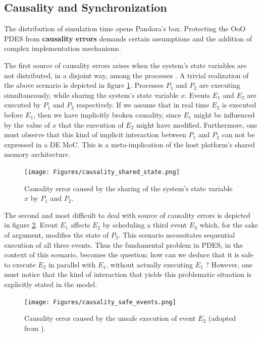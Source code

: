 \documentclass[12pt,twoside]{article}
\begin{document}
\subsection{Causality and Synchronization}
\label{sec-4-5}
The distribution of simulation time opens Pandora's box. 
Protecting the OoO PDES from \textbf{causality errors} demands certain assumptions and the addition of complex implementation mechanisms.

The first source of causality errors arises when the system's state variables are not distributed, in a disjoint way, among the processes \cite{Fujimoto1990}.
A trivial realization of the above scenario is depicted in figure \ref{fig:causality_shared_state}. Processes $P_1$ and $P_2$ are executing simultaneously, while sharing the system's state variable $x$.
Events $E_1$ and $E_2$ are executed by $P_1$ and $P_2$ respectively. If we assume that in real time $E_2$ is executed before $E_1$, then we have implicitly broken causality, since $E_1$ might be influenced
by the value of $x$ that the execution of $E_2$ might have modified. Furthermore, one must observe that this kind of implicit interaction between $P_1$ and $P_2$ can not be expressed in a DE MoC. 
This is a meta-implication of the host platform's shared memory architecture.

\begin{figure}[H]
\centering
\texttt{[image: Figures/causality\_shared\_state.png]}
\caption{\label{fig:causality_shared_state}Causality error caused by the sharing of the system's state variable $x$ by $P_1$ and $P_2$.}
\end{figure}

The second and most difficult to deal with source of causality errors is depicted in figure \ref{fig:causality_safe_events}. 
Event $E_1$ affects $E_2$ by scheduling a third event $E_3$ which, for the sake of argument, modifies the state of $P_2$. 
This scenario necessitates sequential execution of all three events. 
Thus the fundamental problem in PDES, in the context of this scenario, becomes the question: how can we deduce that it is safe to execute $E_2$ in parallel with $E_1$, without actually executing $E_1$ \cite{Fujimoto1990}?
However, one must notice that the kind of interaction that yields this problematic situation is explicitly stated in the model.

\begin{figure}[H]
\centering
\texttt{[image: Figures/causality\_safe\_events.png]}
\caption{\label{fig:causality_safe_events}Causality error caused by the unsafe execution of event $E_2$ (adopted from \cite{Fujimoto1990}).}
\end{figure}
\end{document}
